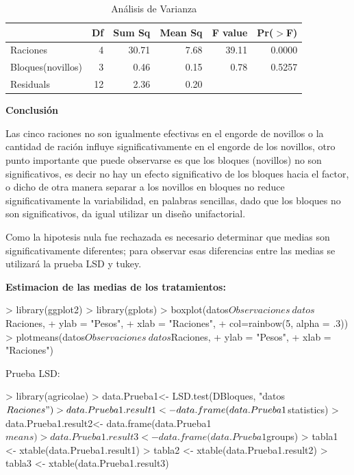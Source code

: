 \documentclass[12pt,letterpaper]{report}
\begin{document}
\begin{table}[ht]
\centering
\begin{tabular}{lrrrrr}
  \hline
 & Df & Sum Sq & Mean Sq & F value & Pr($>$F) \\ 
  \hline
Raciones & 4 & 30.71 & 7.68 & 39.11 & 0.0000 \\ 
Bloques(novillos) & 3 & 0.46 & 0.15 & 0.78 & 0.5257 \\ 
  Residuals & 12 & 2.36 & 0.20 &  &  \\ 
   \hline
\end{tabular}
\caption{Análisis de Varianza}
\end{table}

\textbf{Conclusión}

Las cinco raciones no son igualmente efectivas en el engorde de novillos o la cantidad de
ración influye significativamente en el engorde de los novillos, otro punto importante que puede observarse es que los bloques (novillos) no son significativos, es decir no hay un efecto significativo de los bloques hacia el factor, o dicho de otra manera separar a los novillos en bloques no reduce significativamente la variabilidad, en palabras sencillas, dado que los bloques no son significativos, da igual utilizar un diseño unifactorial.

Como la hipotesis nula fue rechazada es necesario determinar
que medias son significativamente diferentes; para observar esas diferencias entre las medias
se utilizará la prueba LSD y tukey.

\textbf{Estimacion de las medias de los tratamientos:}
\begin{Schunk}
\begin{Sinput}
> library(ggplot2)
> library(gplots)
> boxplot(datos$Observaciones~datos$Raciones,
+         ylab = "Pesos",
+         xlab = "Raciones",
+         col=rainbow(5, alpha = .3))
> plotmeans(datos$Observaciones~datos$Raciones,
+           ylab = "Pesos",
+           xlab = "Raciones")
\end{Sinput}
\end{Schunk}

Prueba LSD:
\begin{Schunk}
\begin{Sinput}
> library(agricolae)
> data.Prueba1<- LSD.test(DBloques, "datos$Raciones")
> data.Prueba1.result1<- data.frame(data.Prueba1$statistics)
> data.Prueba1.result2<- data.frame(data.Prueba1$means)
> data.Prueba1.result3<- data.frame(data.Prueba1$groups)
> tabla1 <- xtable(data.Prueba1.result1)
> tabla2 <- xtable(data.Prueba1.result2)
> tabla3 <- xtable(data.Prueba1.result3)
\end{Sinput}
\end{Schunk}
\end{document}
